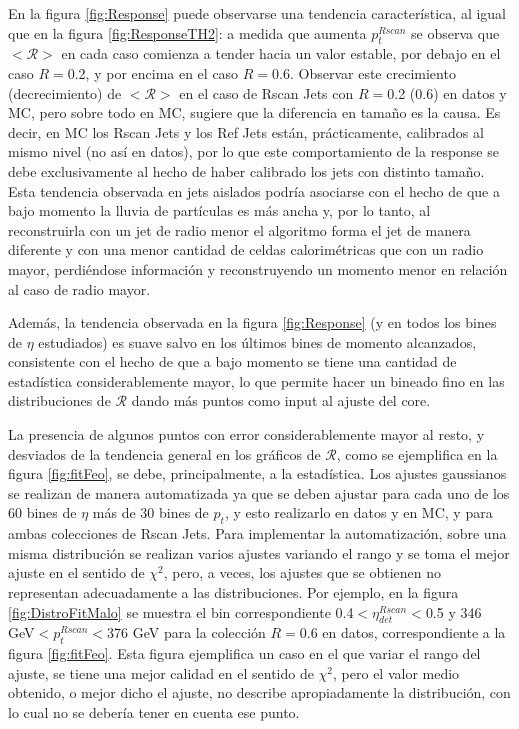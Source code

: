 En la figura \ref{fig:Response} puede observarse una tendencia característica, al igual que en la figura \ref{fig:ResponseTH2}: a medida que aumenta $p_t^{Rscan}$ se observa que $<\mathcal{R}>$ en cada caso comienza a tender hacia un valor estable, por debajo en el caso $R=$0.2, y por encima en el caso $R=$0.6. Observar este crecimiento (decrecimiento) de $<\mathcal{R}>$ en el caso de Rscan Jets con $R=$0.2 (0.6) en datos y MC, pero sobre todo en MC, sugiere que la diferencia en tamaño es la causa. Es decir, en MC los Rscan Jets y los Ref Jets están, prácticamente, calibrados al mismo nivel (no así en datos), por lo que este comportamiento de la response se debe exclusivamente al hecho de haber calibrado los jets con distinto tamaño. Esta tendencia observada en jets aislados podría asociarse con el hecho de que a bajo momento la lluvia de partículas es más ancha y, por lo tanto, al reconstruirla con un jet de radio menor el algoritmo forma el jet de manera diferente y con una menor cantidad de celdas calorimétricas que con un radio mayor, perdiéndose información y reconstruyendo un momento menor en relación al caso de radio mayor.

Además, la tendencia observada en la figura \ref{fig:Response} (y en todos los bines de $\eta$ estudiados) es suave salvo en los últimos bines de momento alcanzados, consistente con el hecho de que a bajo momento se tiene una cantidad de estadística considerablemente mayor, lo que permite hacer un bineado fino en las distribuciones de $\mathcal{R}$ dando más puntos como input al ajuste del core. 

La presencia de algunos puntos con error considerablemente mayor al resto, y desviados de la tendencia general en los gráficos de $\mathcal{R}$, como se ejemplifica en la figura \ref{fig:fitFeo}, se debe, principalmente, a la estadística. Los ajustes gaussianos se realizan de manera automatizada ya que se deben ajustar para cada uno de los 60 bines de $\eta$ más de 30 bines de $p_t$, y esto realizarlo en datos y en MC, y para ambas colecciones de Rscan Jets. Para implementar la automatización, sobre una misma distribución se realizan varios ajustes variando el rango y se toma el mejor ajuste en el sentido de $\chi^2$, pero, a veces, los ajustes que se obtienen no representan adecuadamente a las distribuciones. Por ejemplo, en la figura \ref{fig:DistroFitMalo} se muestra el bin correspondiente 0.4$<\eta^{Rscan}_{det}<$0.5 y 346 GeV$<p^{Rscan}_{t}<$376 GeV para la colección $R=$0.6 en datos, correspondiente a la figura \ref{fig:fitFeo}. Esta figura ejemplifica un caso en el que variar el rango del ajuste, se tiene una mejor calidad en el sentido de $\chi^2$, pero el valor medio obtenido, o mejor dicho el ajuste, no describe apropiadamente la distribución, con lo cual no se debería tener en cuenta ese punto.


